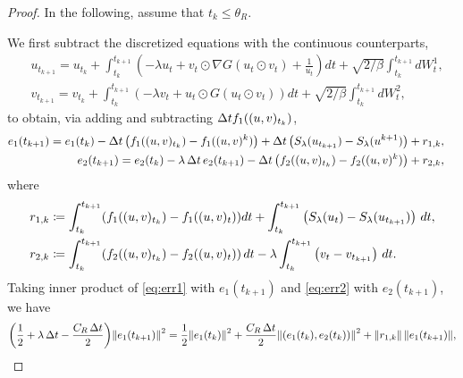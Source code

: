 \documentclass[11pt, twoside]{report}
\begin{document}
\begin{proof}
In the following, assume that $t_k \leq \theta_R$. 

We first subtract the discretized equations with  the continuous counterparts,
\begin{align*}
&u_{t_{k+1} } = u_{t_k} +  \int_{t_k}^{t_{k+1}}  \left( -\lambda u_t + v_t\odot \nabla G(u_t\odot v_t) + \frac{1}{u_t}\right) dt + \sqrt{2/\beta}\int_{t_k}^{t_{k+1}}  dW^1_t,\\
&v_{t_{k+1} } = v_{t_k} +  \int_{t_k}^{t_{k+1}}  \left( -\lambda v_t + u_t\odot G(u_t \odot v_t) \right) dt + \sqrt{2/\beta}\int_{t_k}^{t_{k+1}} dW^2_t,
\end{align*}
to obtain, via adding and subtracting ${\Delta t} f_1((u,v)_{t_k})$,
\begin{align}
    \begin{split}    
    e_1(t_{k+1}) &= e_1(t_{k}) - \deltat \,\pa{f_1((u,v)_{t_k}) - f_1((u,v)^k)  }+ \deltat \,\pa{S_\lambda(u_{t_{k+1}}) - S_\lambda(u^{k+1})} + r_{1,k},
    \end{split}    \label{eq:err1}\\
    \begin{split}
    e_2(t_{k+1}) &= e_2(t_{k}) - \lambda\,\deltat\, e_2(t_{k+1})  - \deltat \,\pa{f_2((u,v)_{t_k}) - f_2((u,v)^k)  }  + r_{2,k},
   \end{split}\label{eq:err2}
\end{align}
where
\begin{align*}
r_{1,k} &\eqdef  \int_{t_k}^{t_{k+1}}  \pa{ f_1((u,v)_{t_k}) - f_1((u,v)_t) } dt + \int_{t_k}^{t_{k+1}} \left( S_\lambda(u_t) - S_\lambda(u_{t_{k+1}})\right) \,dt,\\
r_{2,k} &\eqdef \int_{t_k}^{t_{k+1}}  \pa{ f_2((u,v)_{t_k}) - f_2((u,v)_t) } \,dt - \lambda \int_{t_k}^{t_{k+1}} \left( v_t - v_{t_{k+1}} \right)\, dt.
\end{align*}
%
Taking inner product of \eqref{eq:err1} with $e_1(t_{k+1})$ and \eqref{eq:err2} with $e_2(t_{k+1})$, we have 
\begin{align*}
    \pa{\frac12 + \lambda \,\deltat - \frac{ C_R\,\tstep}{2}} \norm{e_1(t_{k+1})}^2 &=\frac12\norm{e_1(t_{k})}^2+ \frac{ C_R\,\tstep }{2} \norm{(e_1(t_{k}),e_2(t_{k}))}^2   + \norm{r_{1,k}}\,\norm{e_1(t_{k+1})}, \\

\end{align*}
\end{proof}
\end{document}
